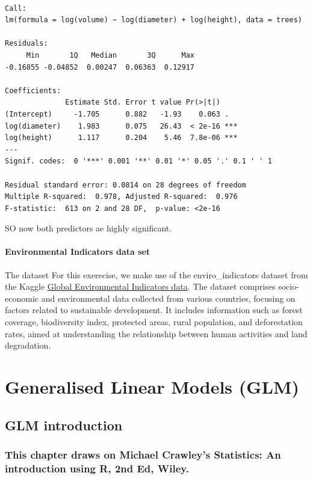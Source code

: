 \documentclass[
  letterpaper,
  DIV=11,
  numbers=noendperiod]{scrreprt}
\begin{document}
\begin{verbatim}

Call:
lm(formula = log(volume) ~ log(diameter) + log(height), data = trees)

Residuals:
     Min       1Q   Median       3Q      Max 
-0.16855 -0.04852  0.00247  0.06363  0.12917 

Coefficients:
              Estimate Std. Error t value Pr(>|t|)    
(Intercept)     -1.705      0.882   -1.93    0.063 .  
log(diameter)    1.983      0.075   26.43  < 2e-16 ***
log(height)      1.117      0.204    5.46  7.8e-06 ***
---
Signif. codes:  0 '***' 0.001 '**' 0.01 '*' 0.05 '.' 0.1 ' ' 1

Residual standard error: 0.0814 on 28 degrees of freedom
Multiple R-squared:  0.978, Adjusted R-squared:  0.976 
F-statistic:  613 on 2 and 28 DF,  p-value: <2e-16
\end{verbatim}

SO now both predictors ae highly significant.

\subsection{Environmental Indicators data
set}\label{environmental-indicators-data-set}

The dataset For this exerecise, we make use of the enviro\_indicators
dataset from the Kaggle
\href{https://www.kaggle.com/datasets/sazidthe1/global-environmental-indicators?resource=download}{Global
Environmental Indicators data}. The dataset comprises socio-economic and
environmental data collected from various countries, focusing on factors
related to sustainable development. It includes information such as
forest coverage, biodiversity index, protected areas, rural population,
and deforestation rates, aimed at understanding the relationship between
human activities and land degradation.

\part{Generalised Linear Models (GLM)}

\chapter{GLM introduction}\label{glm-introduction}

\section{This chapter draws on Michael Crawley's Statistics: An
introduction using R, 2nd Ed,
Wiley.}\label{this-chapter-draws-on-michael-crawleys-statistics-an-introduction-using-r-2nd-ed-wiley.}
\end{document}
